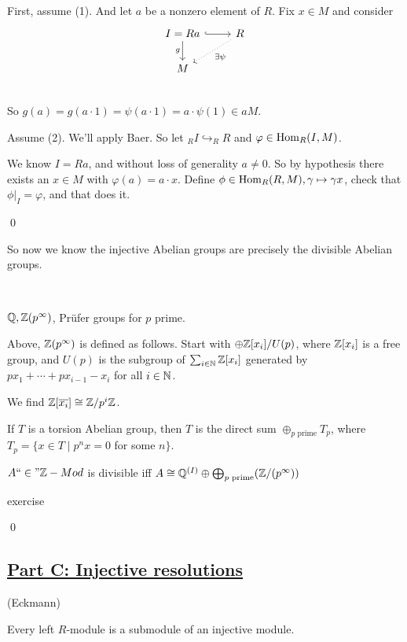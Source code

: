 \documentclass[x11names,reqno,14pt]{extarticle}
\newcommand{\fin}{``\in"}
\begin{document}
\proof

First, assume (1). And let $a$ be a nonzero element of $R$. Fix $x \in M$ and consider 
\[
\begin{tikzcd}
I = Ra\ar[d,"g"'] \ar[r, hook] & R \ar[dl, dotted, "\exists\psi"] \\
M & \\
\end{tikzcd}
\]
So $g(a) = g(a\cdot 1) = \psi(a\cdot 1) = a\cdot\psi(1) \in aM$.

Assume (2). We'll apply Baer. So let $_RI\hookrightarrow _RR$ and $\varphi \in {\mathrm{Hom}}_R(I, M)$. 

We know $I = Ra$, and without loss of generality $a \neq 0$. So by hypothesis there exists an $x \in M$ with $\varphi(a) = a\cdot x$. Define $\phi\in{\mathrm{Hom}}_R(R, M), \gamma\mapsto\gamma x$, check that $\phi|_I = \varphi$, and that does it. 

\qed

So now we know the injective Abelian groups are precisely the divisible Abelian groups. 

\exm\,

$\mathbb{Q}, \mathbb{Z}(p^\infty)$, Pr\"ufer groups for $p$ prime.

Above, $\mathbb{Z}(p^\infty)$ is defined as follows. Start with $\oplus\mathbb{Z}[x_i]/U(p)$, where $\mathbb{Z}[x_i]$ is a free group, and $U(p)$ is the subgroup of $\sum_{i\in\mathbb{N}}\mathbb{Z}[x_i]$ generated by $px_1 + \cdots + px_{i - 1} - x_i$ for all $i \in \mathbb{N}$. 

We find $\mathbb{Z}[\overline{x_i}] \cong \mathbb{Z}/p^i\mathbb{Z}$.

\rem

If $T$ is a torsion Abelian group, then $T$ is the direct sum $\oplus_{p\text{ prime}}T_p$, where $T_p = \{x\in T \mid p^nx = 0$ for some $n\}$.

\thm

$A \fin \Z-Mod$ is divisible iff $A \cong \mathbb{Q}^{(I)}\oplus\bigoplus_{p\text{ prime}}(\mathbb{Z}/(p^\infty))$

\proof

exercise

\qed

\subsection*{\underline{Part C: Injective resolutions}}

\thm (Eckmann)

Every left $R$-module is a submodule of an injective module. 

\lem 
\end{document}
